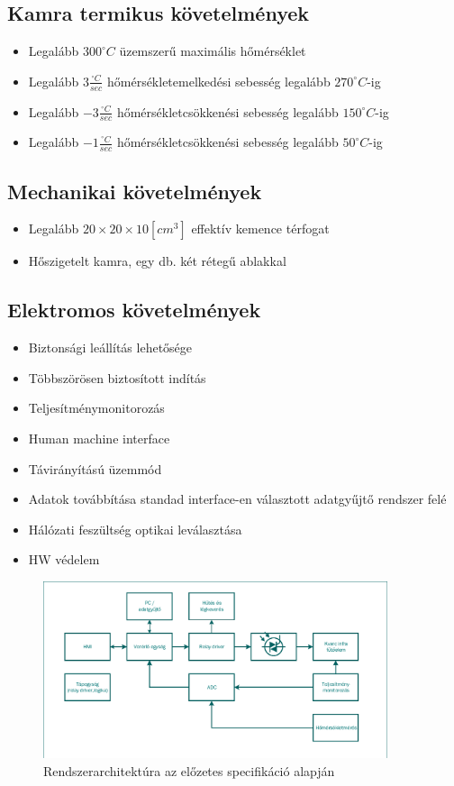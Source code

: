 \documentclass[11pt]{article} %
\begin{document}
\subsection{Kamra termikus követelmények}
\begin{itemize}
\item Legalább $300 ^{\circ}C$ üzemszerű maximális hőmérséklet
\item Legalább $3 \frac{^{\circ}C}{sec}$  hőmérsékletemelkedési sebesség legalább $270 ^{\circ}C$-ig
\item Legalább $-3 \frac{^{\circ}C}{sec}$  hőmérsékletcsökkenési sebesség legalább $150 ^{\circ}C$-ig
\item Legalább $-1 \frac{^{\circ}C}{sec}$  hőmérsékletcsökkenési sebesség legalább $50 ^{\circ}C$-ig
\end{itemize}

\subsection{Mechanikai követelmények}
\begin{itemize}
\item Legalább $20\times20\times10 [cm^3]$ effektív kemence térfogat
\item Hőszigetelt kamra, egy db. két rétegű ablakkal
\end{itemize}


\subsection{Elektromos követelmények}
\begin{itemize}
\item Biztonsági leállítás lehetősége
\item Többszörösen biztosított indítás
\item Teljesítménymonitorozás
\item Human machine interface
\item Távirányítású üzemmód
\item Adatok továbbítása standad interface-en választott adatgyűjtő rendszer felé
\item Hálózati feszültség optikai leválasztása
\item HW védelem
\end{itemize}

\begin{figure}[hbt!]
 \centering
 \includegraphics[width=0.9\textwidth]{spec_v10}
 \caption{Rendszerarchitektúra az előzetes specifikáció alapján}
\end{figure}
\end{document}
